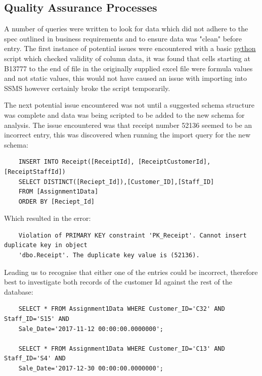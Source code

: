 \documentclass{article}
\newcounter{num}
\begin{document}
        \subsection{Quality Assurance Processes}
        \label{sec:QAP}
            A number of queries were written to look for data which did not adhere to the spec
            outlined in business requirements and to ensure data was "clean" before entry.
            The first instance of potential issues were encountered with a basic \hyperref[sec:Python]{\color{blue}python} script
            which checked validity of column data, it was found that cells starting at B13777
            to the end of file in the originally supplied excel file were formula values and 
            not static values, this would not have caused an issue with importing into SSMS 
            however certainly broke the script temporarily.
            \vspace{5mm}
            \par\noindent
            The next potential issue encountered was not until a suggested schema structure 
            was complete and data was being scripted to be added to the new schema for analysis.
            The issue encountered was that receipt number 52136 seemed to be an incorrect 
            entry, this was discovered when running the import query for the new schema:
            \begin{verbatim}
    INSERT INTO Receipt([ReceiptId], [ReceiptCustomerId],[ReceiptStaffId])
    SELECT DISTINCT([Reciept_Id]),[Customer_ID],[Staff_ID]
    FROM [Assignment1Data]
    ORDER BY [Reciept_Id]
            \end{verbatim}
            Which resulted in the error:
            \color{red}
            \begin{verbatim}
    Violation of PRIMARY KEY constraint 'PK_Receipt'. Cannot insert duplicate key in object 
    'dbo.Receipt'. The duplicate key value is (52136).
            \end{verbatim}
            \color{black}
            Leading us to recognise that either one of the entries could be incorrect, therefore
            best to investigate both records of the customer Id against the rest of the database:
            \begin{verbatim}
    SELECT * FROM Assignment1Data WHERE Customer_ID='C32' AND Staff_ID='S15' AND 
    Sale_Date='2017-11-12 00:00:00.0000000';

    SELECT * FROM Assignment1Data WHERE Customer_ID='C13' AND Staff_ID='S4' AND 
    Sale_Date='2017-12-30 00:00:00.0000000';
            \end{verbatim}
\end{document}
